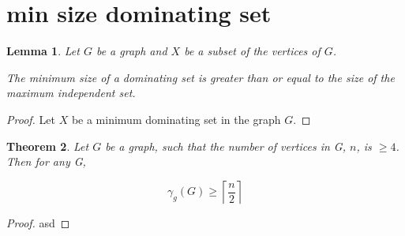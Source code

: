 \documentclass[11pt
              , a4paper
              , twoside
              , openright
              ]{report}
\newtheorem{theorem}{Theorem}[chapter]
\newtheorem{lemma}[theorem]{Lemma}
\theoremstyle{definition}
\begin{document}
\section{min size dominating set}

\begin{lemma}
    Let $G$ be a graph and $X$ be a subset of the vertices of $G$. 
    
    The minimum size of a dominating set is greater than or equal to the size of the maximum independent set.
     
\end{lemma}

\begin{proof}
    
    Let $X$ be a minimum dominating set in the graph $G$.
    
    
    
\end{proof}

\begin{theorem} \label{minDomSize}
    Let $G$ be a graph, such that the number of vertices in G, $n$, is $\geq 4$. Then for any G,
    
    \[ \gamma_g(G) \geq \left \lceil{\frac{n}{2}}\right \rceil \]
    
\end{theorem}

\begin{proof}
asd    
\end{proof}


\backmatter



%


\end{document}
